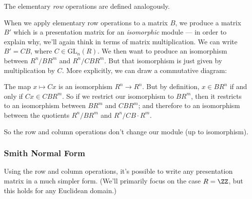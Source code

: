 The elementary \emph{row} operations are defined analogously. 

When we apply elementary row operations to a matrix $B$, we produce a matrix $B'$ which is a presentation matrix for an \emph{isomorphic} module --- in order to explain why, we'll again think in terms of matrix multiplication. We can write $B' = CB$, where $C \in \mathrm{GL}_n(R)$. We then want to produce an isomorphism between $R^n/BR^m$ and $R^n/CBR^m$. But that isomorphism is just given by multiplication by $C$. More explicitly, we can draw a commutative diagram:



\begin{center}
\end{center}

The map $x \mapsto Cx$ is an isomorphism $R^n \to R^n$. But by definition, $x \in BR^n$ if and only if $Cx \in CBR^m$. So if we restrict our isomorphism to $BR^m$, then it restricts to an isomorphism between $BR^m$ and $CBR^m$; and therefore to an isomorphism between the quotients $R^n/BR^m$ and $R^n/CB\cdot R^m$. %

So the row and column operations don't change our module (up to isomorphism). 

\subsubsection{Smith Normal Form}

Using the row and column operations, it's possible to write any presentation matrix in a much simpler form. (We'll primarily focus on the case $R = \ZZ$, but this holds for any Euclidean domain.)

